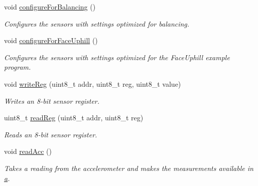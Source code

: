 \begin{DoxyCompactItemize}
\mbox{\label{class_zumo32_u4_i_m_u_a78786abfc220e14ebb603b72dce8f4ca}} 
void \hyperlink{class_zumo32_u4_i_m_u_a78786abfc220e14ebb603b72dce8f4ca}{configure\+For\+Balancing} ()
\begin{DoxyCompactList}\small\item\em Configures the sensors with settings optimized for balancing. \end{DoxyCompactList}\item 
\mbox{\label{class_zumo32_u4_i_m_u_af9992e0ff9c372edc8d3a5d165411263}} 
void \hyperlink{class_zumo32_u4_i_m_u_af9992e0ff9c372edc8d3a5d165411263}{configure\+For\+Face\+Uphill} ()
\begin{DoxyCompactList}\small\item\em Configures the sensors with settings optimized for the Face\+Uphill example program. \end{DoxyCompactList}\item 
void \hyperlink{class_zumo32_u4_i_m_u_ab5cb0c1c2342386c13afe36f7064d1e8}{write\+Reg} (uint8\+\_\+t addr, uint8\+\_\+t reg, uint8\+\_\+t value)
\begin{DoxyCompactList}\small\item\em Writes an 8-\/bit sensor register. \end{DoxyCompactList}\item 
uint8\+\_\+t \hyperlink{class_zumo32_u4_i_m_u_a8bc90dccbd0259a97a5f0bd1e8f0316a}{read\+Reg} (uint8\+\_\+t addr, uint8\+\_\+t reg)
\begin{DoxyCompactList}\small\item\em Reads an 8-\/bit sensor register. \end{DoxyCompactList}\item 
\mbox{\label{class_zumo32_u4_i_m_u_a034c243ac0be1892af67c71759aa577c}} 
void \hyperlink{class_zumo32_u4_i_m_u_a034c243ac0be1892af67c71759aa577c}{read\+Acc} ()
\begin{DoxyCompactList}\small\item\em Takes a reading from the accelerometer and makes the measurements available in \hyperlink{class_zumo32_u4_i_m_u_a386b34407b744844d403e5e0041dc475}{a}. \end{DoxyCompactList}\item 
\mbox{\label{class_zumo32_u4_i_m_u_a1c460bf87ffc7d671b398bf9ef4951d6}} 

\end{DoxyCompactItemize}
